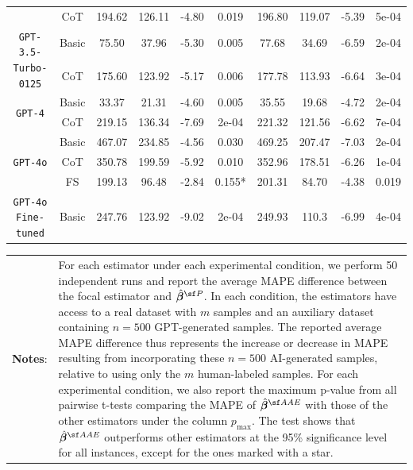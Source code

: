 \begin{table}[!t]
{\begin{tabular}{cccccccccc}
 & CoT & 194.62 & 126.11 & -4.80 & 0.019 & 196.80 & 119.07 & -5.39 & 5e-04 \\
\multirow{2}{*}{\texttt{GPT-3.5-Turbo-0125}} & Basic & 75.50 & 37.96 & -5.30 & 0.005 & 77.68 & 34.69 & -6.59 & 2e-04 \\
 & CoT & 175.60 & 123.92 & -5.17 & 0.006 & 177.78 & 113.93 & -6.64 & 3e-04 \\
\multirow{2}{*}{\texttt{GPT-4}} & Basic & 33.37 & 21.31 & -4.60 & 0.005 & 35.55 & 19.68 & -4.72 & 2e-04 \\
 & CoT & 219.15 & 136.34 & -7.69 & 2e-04 & 221.32 & 121.56 & -6.62 & 7e-04 \\
\multirow{3}{*}{\texttt{GPT-4o}} & Basic & 467.07 & 234.85 & -4.56 & 0.030 & 469.25 & 207.47 & -7.03 & 2e-04 \\
 & CoT & 350.78 & 199.59 & -5.92 & 0.010 & 352.96 & 178.51 & -6.26 & 1e-04 \\
 & FS & 199.13 & 96.48 & -2.84 & 0.155* & 201.31 & 84.70 & -4.38 & 0.019 \\
\texttt{GPT-4o Fine-tuned} & Basic & 247.76 & 123.92 & -9.02 & 2e-04 & 249.93 & 110.3 & -6.99 & 4e-04
\\\hline\hline
\end{tabular} 
\begin{minipage}{15.5cm}
    \footnotesize
    \vspace{3pt}
    \begin{tabular}{p{1cm} p{14cm}}
         \textbf{Notes}: & \setlength{\baselineskip}{1.2\baselineskip}For each estimator under each experimental condition, we perform 50 independent runs and report the average MAPE difference between the focal estimator and $\hat{\betavec}^{\sf P}$. In each condition, the estimators have access to a real dataset with $m$ samples and an auxiliary dataset containing $n = 500$ GPT-generated samples. The reported average MAPE difference thus represents the increase or decrease in MAPE resulting from incorporating these $n = 500$ AI-generated samples, relative to using only the $m$ human-labeled samples. For each experimental condition, we also report the maximum p-value from all pairwise t-tests comparing the MAPE of $\hat{\betavec}^{\sf AAE}$ with those of the other estimators under the column $p_{\max}$. The test shows that $\hat{\betavec}^{\sf AAE}$ outperforms other estimators at the 95\% significance level for all instances, except for the ones marked with a star. 

\end{tabular}
\end{minipage}}
\end{table}
